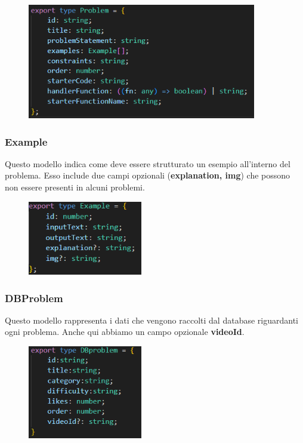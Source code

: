 \documentclass[11pt, a4paper]{article}
\theoremstyle{definition}
\begin{document}
\begin{figure}[H]
  \centering
  \includegraphics[width=10cm]{materiale/Problem Template.png}
\end{figure}

\subsubsection*{Example}
Questo modello indica come deve essere strutturato un esempio all'interno del problema. Esso include due campi opzionali (\textbf{explanation, img}) che possono non essere presenti in alcuni problemi.
\begin{figure}[H]
  \centering
  \includegraphics[width=5cm]{materiale/Example Template.png}  
\end{figure}

\subsubsection*{DBProblem}
Questo modello rappresenta i dati che vengono raccolti dal database riguardanti ogni problema. Anche qui abbiamo un campo opzionale \textbf{videoId}.
\begin{figure}[H]
  \centering
  \includegraphics[width=5cm]{materiale/DBProblem Template.png}
\end{figure}
\end{document}
